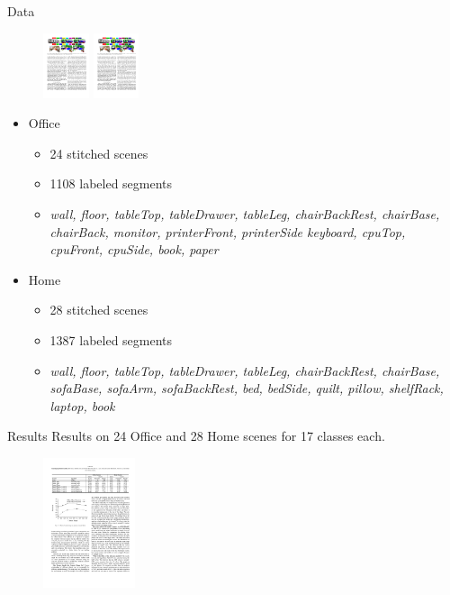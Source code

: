 \documentclass{beamer}
\begin{document}
\begin{frame}{Data}
	\begin{figure}
	\includegraphics[width=0.5\linewidth,height=0.75in]{office_scene.pdf}
	\includegraphics[width=0.5\linewidth,height=0.75in]{home_scene.pdf}
	\end{figure}

   \begin{itemize}
   \item Office 

   	\begin{itemize}
	\item 24 stitched scenes
	\item 1108 labeled segments
	\item {\scriptsize  \emph{wall, floor, tableTop, tableDrawer, tableLeg, chairBackRest, chairBase, chairBack, monitor, printerFront, printerSide keyboard, cpuTop, cpuFront, cpuSide, book, paper}}
	\end{itemize}



   \item Home
   	\begin{itemize}
   	\item  28 stitched scenes
	\item 1387 labeled segments
	\item {\scriptsize  \emph{wall, floor, tableTop, tableDrawer, tableLeg, chairBackRest, chairBase, sofaBase, sofaArm, sofaBackRest, bed, bedSide, quilt, pillow, shelfRack, laptop, book }}
	\end{itemize} 
\end{itemize}

\end{frame}

\begin{frame}{Results }
Results on 24 Office and 28 Home scenes for 17 classes each.
\begin{figure}[t!]
\includegraphics[width=\linewidth,height=1.5in]{results_table.pdf}
\end{figure}
\end{frame}
\end{document}
